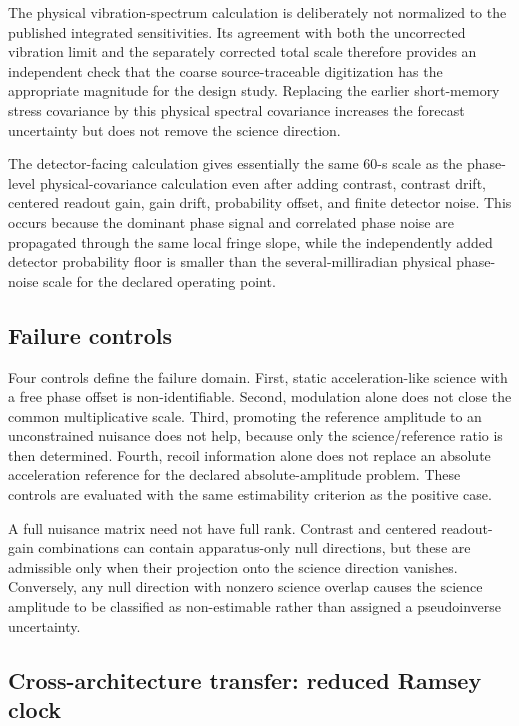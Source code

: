 The physical vibration-spectrum calculation is deliberately not normalized to the published integrated sensitivities. Its agreement with both the uncorrected vibration limit and the separately corrected total scale therefore provides an independent check that the coarse source-traceable digitization has the appropriate magnitude for the design study. Replacing the earlier short-memory stress covariance by this physical spectral covariance increases the forecast uncertainty but does not remove the science direction.

The detector-facing calculation gives essentially the same $60$-s scale as the phase-level physical-covariance calculation even after adding contrast, contrast drift, centered readout gain, gain drift, probability offset, and finite detector noise. This occurs because the dominant phase signal and correlated phase noise are propagated through the same local fringe slope, while the independently added detector probability floor is smaller than the several-milliradian physical phase-noise scale for the declared operating point.

\subsection{Failure controls}

Four controls define the failure domain. First, static acceleration-like science with a free phase offset is non-identifiable. Second, modulation alone does not close the common multiplicative scale. Third, promoting the reference amplitude to an unconstrained nuisance does not help, because only the science/reference ratio is then determined. Fourth, recoil information alone does not replace an absolute acceleration reference for the declared absolute-amplitude problem. These controls are evaluated with the same estimability criterion as the positive case.

A full nuisance matrix need not have full rank. Contrast and centered readout-gain combinations can contain apparatus-only null directions, but these are admissible only when their projection onto the science direction vanishes. Conversely, any null direction with nonzero science overlap causes the science amplitude to be classified as non-estimable rather than assigned a pseudoinverse uncertainty.

\subsection{Cross-architecture transfer: reduced Ramsey clock}
\label{sec:clock-transfer}

